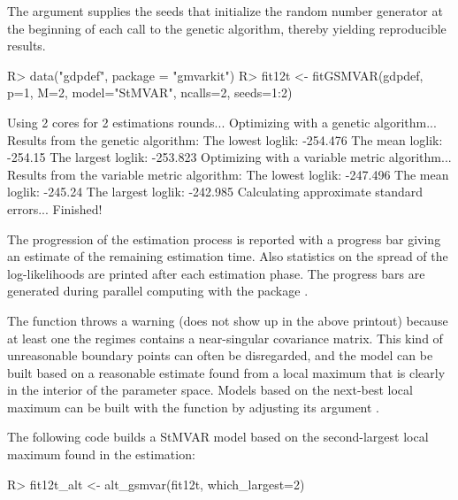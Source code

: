 \documentclass[nojss]{jss} %
\begin{document}
The argument  supplies the seeds that initialize the random number generator at the beginning of each call to the genetic algorithm, thereby yielding reproducible results.
%
\begin{Schunk}
\begin{Sinput}
R> data("gdpdef", package = "gmvarkit")
R> fit12t <- fitGSMVAR(gdpdef, p=1, M=2, model="StMVAR", ncalls=2, seeds=1:2)
\end{Sinput}
\begin{Soutput}
Using 2 cores for 2 estimations rounds... 
Optimizing with a genetic algorithm...
Results from the genetic algorithm:
The lowest loglik:  -254.476 
The mean loglik:    -254.15 
The largest loglik: -253.823 
Optimizing with a variable metric algorithm...
Results from the variable metric algorithm:
The lowest loglik:  -247.496 
The mean loglik:    -245.24 
The largest loglik: -242.985 
Calculating approximate standard errors...
Finished!
\end{Soutput}
\end{Schunk}
%

The progression of the estimation process is reported with a progress bar giving an estimate of the remaining estimation time. Also statistics on the spread of the log-likelihoods are printed after each estimation phase. The progress bars are generated during parallel computing with the package  \citep{Solymos+Zawadzki:2020}.

The function throws a warning (does not show up in the above printout) because at least one the regimes contains a near-singular covariance matrix. This kind of unreasonable boundary points can often be disregarded, and the model can be built based on a reasonable estimate found from a local maximum that is clearly in the interior of the parameter space. Models based on the next-best local maximum can be built with the function  by adjusting its argument .

The following code builds a StMVAR model based on the second-largest local maximum found in the estimation:
%
\begin{Schunk}
\begin{Sinput}
R> fit12t_alt <- alt_gsmvar(fit12t, which_largest=2)
\end{Sinput}
\end{Schunk}
%

\end{document}
